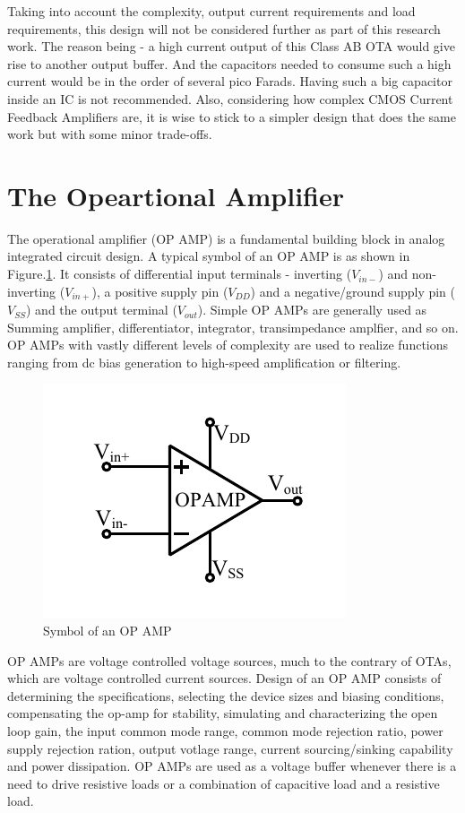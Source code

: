 Taking into account the complexity, output current requirements and load requirements, this design will not be considered further as part of this research work. The reason being - a high current output of this Class AB OTA would give rise to another output buffer. And the capacitors needed to consume such a high current would be in the order of several pico Farads. Having such a big capacitor inside an IC is not recommended. Also, considering how complex CMOS Current Feedback Amplifiers are, it is wise to stick to a simpler design that does the same work but with some minor trade-offs.
\vfill
\clearpage

\section{The Opeartional Amplifier}
The operational amplifier (OP AMP) is a fundamental building block in analog integrated circuit design. A typical symbol of an OP AMP is as shown in Figure.\ref{fig:OPAMP_symbol}. It consists of differential input terminals - inverting ($V_{in-}$) and non-inverting ($V_{in+}$), a positive supply pin ($V_{DD}$) and a negative/ground supply pin ($V_{SS}$) and the output terminal ($V_{out}$). Simple OP AMPs are generally used as Summing amplifier, differentiator, integrator, transimpedance amplfier, and so on. OP AMPs with vastly different levels of complexity are used to realize functions ranging from dc bias generation to high-speed amplification or filtering.

\begin{figure} [H]
\centering
\includegraphics[scale=1]{Figures/System_Level/OPAMP_Symbol.pdf}
\caption{Symbol of an OP AMP}
\label{fig:OPAMP_symbol}
\end{figure}

OP AMPs are voltage controlled voltage sources, much to the contrary of OTAs, which are voltage controlled current sources. Design of an OP AMP consists of determining the specifications, selecting the device sizes and biasing conditions, compensating the op-amp for stability, simulating and characterizing the open loop gain, the input common mode range, common mode rejection ratio, power supply rejection ration, output votlage range, current sourcing/sinking capability and power dissipation.
OP AMPs are used as a voltage buffer whenever there is a need to drive resistive loads or a combination of capacitive load and a resistive load.

